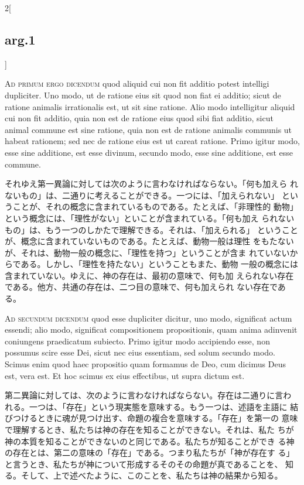 \documentclass[paper=a4paper,fontsize=10pt,jafontsize=9pt,titlepage]{jlreq}
\begin{document}
\begin{paracol}{2}[\subsection{arg.1}]
\switchcolumn*[\subsection{ad.1}]

\textsc{Ad primum ergo dicendum} quod aliquid cui non fit additio
potest intelligi dupliciter.  Uno modo, ut de ratione eius sit quod
non fiat ei additio; sicut de ratione animalis irrationalis est, ut
sit sine ratione.  Alio modo intelligitur aliquid cui non fit additio,
quia non est de ratione eius quod sibi fiat additio, sicut animal
commune est sine ratione, quia non est de ratione animalis communis ut
habeat rationem; sed nec de ratione eius est ut careat ratione.  Primo
igitur modo, esse sine additione, est esse divinum, secundo modo, esse
sine additione, est esse commune.

\switchcolumn

それゆえ第一異論に対しては次のように言わなければならない。「何も加えら
れないもの」は、二通りに考えることができる。一つには、「加えられない」
ということが、それの概念に含まれているものである。たとえば、「非理性的
動物」という概念には、「理性がない」といことが含まれている。「何も加え
られないもの」は、もう一つのしかたで理解できる。それは、「加えられる」
ということが、概念に含まれていないものである。たとえば、動物一般は理性
をもたないが、それは、動物一般の概念に、「理性を持つ」ということが含ま
れていないからである。しかし、「理性を持たない」ということもまた、動物
一般の概念には含まれていない。ゆえに、神の存在は、最初の意味で、何も加
えられない存在である。他方、共通の存在は、二つ目の意味で、何も加えられ
ない存在である。

\switchcolumn*[\subsection{ad.2}]

\textsc{Ad secundum dicendum} quod esse dupliciter dicitur, uno modo,
significat actum essendi; alio modo, significat compositionem
propositionis, quam anima adinvenit coniungens praedicatum subiecto.
Primo igitur modo accipiendo esse, non possumus scire esse Dei, sicut
nec eius essentiam, sed solum secundo modo. Scimus enim quod haec
propositio quam formamus de Deo, cum dicimus Deus est, vera est. Et
hoc scimus ex eius effectibus, ut supra dictum est.

\switchcolumn

第二異論に対しては、次のように言わなければならない。存在は二通りに言わ
れる。一つは、「存在」という現実態を意味する。もう一つは、述語を主語に
結びつけるときに魂が見つけ出す、命題の複合を意味する。「存在」を第一の
意味で理解するとき、私たちは神の存在を知ることができない。それは、私た
ちが神の本質を知ることができないのと同じである。私たちが知ることができ
る神の存在とは、第二の意味の「存在」である。つまり私たちが「神が存在す
る」と言うとき、私たちが神について形成するそのその命題が真であることを、
知る。そして、上で述べたように、このことを、私たちは神の結果から知る。

\end{paracol}
\end{document}
